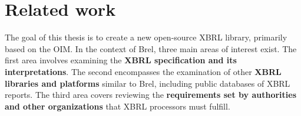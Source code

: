 \chapter{Related work}
\label{sec:related_work}
The goal of this thesis is to create a new open-source XBRL library, primarily based on the OIM.
In the context of Brel, three main areas of interest exist.
The first area involves examining the \textcolor{airforceblue}{\textbf{XBRL specification and its interpretations}}.
The second encompasses the examination of other \textcolor{tropicalrainforest}{\textbf{XBRL libraries and platforms}} similar to Brel, including public databases of XBRL reports.
The third area covers reviewing the \textcolor{turkishrose}{\textbf{requirements set by authorities and other organizations}} that XBRL processors must fulfill.

